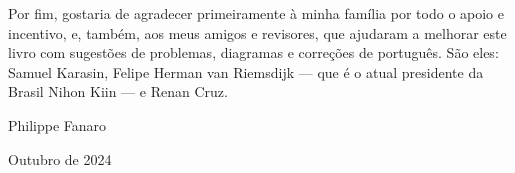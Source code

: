 Por fim, gostaria de agradecer primeiramente à minha família por todo o apoio e incentivo, e, também, aos meus amigos e revisores, que ajudaram a melhorar este livro com sugestões de problemas, diagramas e correções de português. São eles: Samuel Karasin, Felipe Herman van Riemsdijk --- que é o atual presidente da Brasil Nihon Kiin --- e Renan Cruz.

\bigskip
\smallskip
\smallskip
\smallskip

\hspace*{\fill} Philippe Fanaro \hspace{0.055cm}

\hspace*{\fill} Outubro de 2024 \hspace{0.05cm}

\clearedpage
\clearedpage